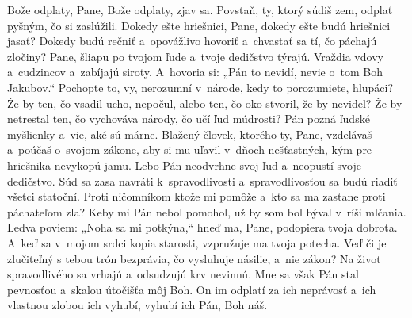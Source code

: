 Bože odplaty, Pane,
Bože odplaty, zjav sa.
\versseparator
Povstaň, ty, ktorý súdiš zem,
odplať pyšným, čo si zaslúžili.
\versseparator
Dokedy ešte hriešnici, Pane,
dokedy ešte budú hriešnici jasať?
\versseparator
Dokedy budú rečniť a~opovážlivo hovoriť
a~chvastať sa tí, čo páchajú zločiny?
\versseparator
Pane, šliapu po tvojom ľude
a~tvoje dedičstvo týrajú.
\versseparator
Vraždia vdovy a~cudzincov
a~zabíjajú siroty.
\versseparator
A~hovoria si: „Pán to nevidí,
nevie o~tom Boh Jakubov.“
\versseparator
Pochopte to, vy, nerozumní v~národe,
kedy to porozumiete, hlupáci?
\versseparator
Že by ten, čo vsadil ucho, nepočul,
alebo ten, čo oko stvoril, že by nevidel?
\versseparator
Že by netrestal ten, čo vychováva národy,
čo učí ľud múdrosti?
\versseparator
Pán pozná ľudské myšlienky
a~vie, aké sú márne.
\versseparator
Blažený človek, ktorého ty, Pane, vzdelávaš
a~poúčaš o~svojom zákone,
\versseparator
aby si mu uľavil v~dňoch nešťastných,
kým pre hriešnika nevykopú jamu.
\versseparator
Lebo Pán neodvrhne svoj ľud
a~neopustí svoje dedičstvo.
\versseparator
Súd sa zasa navráti k~spravodlivosti
a~spravodlivosťou sa budú riadiť všetci statoční.
\versseparator
Proti ničomníkom ktože mi pomôže
a~kto sa ma zastane proti páchateľom zla?
\versseparator
Keby mi Pán nebol pomohol,
už by som bol býval v~ríši mlčania.
\versseparator
Ledva poviem: „Noha sa mi potkýna,“
hneď ma, Pane, podopiera tvoja dobrota.
\versseparator
A~keď sa v~mojom srdci kopia starosti,
vzpružuje ma tvoja potecha.
\versseparator
Veď či je zlučiteľný s tebou trón bezprávia,
čo vysluhuje násilie, a~nie zákon?
\versseparator
Na život spravodlivého sa vrhajú
a~odsudzujú krv nevinnú.
\versseparator
Mne sa však Pán stal pevnosťou
a~skalou útočišťa môj Boh.
\versseparator
On im odplatí za ich neprávosť
a~ich vlastnou zlobou ich vyhubí,
vyhubí ich Pán, Boh náš. 